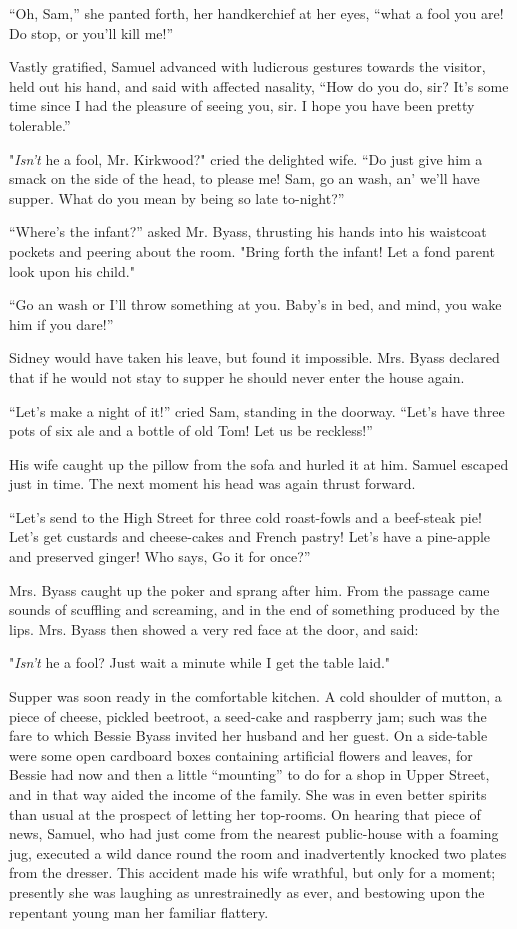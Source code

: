 ``Oh, Sam,'' she panted forth, her handkerchief at her eyes, ``what a
fool you are! Do stop, or you'll kill me!''

Vastly gratified, Samuel advanced with ludicrous gestures towards the
visitor, held out his hand, and said with affected nasality, ``How do
you do, sir? It's some time since I had the pleasure of seeing you, sir.
I hope you have been pretty tolerable.''

"\emph{Isn't} he a fool, Mr. Kirkwood?" cried the delighted wife. ``Do
just give him a smack on the side of the head, to please me! Sam, go an
wash, an' we'll have supper. What do you mean by being so late
to-night?''

``Where's the infant?'' asked Mr. Byass, thrusting his hands into his
waistcoat pockets and peering about the room. "Bring forth {}the infant!
Let a fond parent look upon his child."

``Go an wash or I'll throw something at you. Baby's in bed, and mind,
you wake him if you dare!''

Sidney would have taken his leave, but found it impossible. Mrs. Byass
declared that if he would not stay to supper he should never enter the
house again.

``Let's make a night of it!'' cried Sam, standing in the doorway.
``Let's have three pots of six ale and a bottle of old Tom! Let us be
reckless!''

His wife caught up the pillow from the sofa and hurled it at him. Samuel
escaped just in time. The next moment his head was again thrust forward.

``Let's send to the High Street for three cold roast-fowls and a
beef-steak pie! Let's get custards and cheese-cakes and French pastry!
Let's have a pine-apple and preserved ginger! Who says, Go it for
once?''

Mrs. Byass caught up the poker and sprang {}after him. From the passage
came sounds of scuffling and screaming, and in the end of something
produced by the lips. Mrs. Byass then showed a very red face at the
door, and said:

"\emph{Isn't} he a fool? Just wait a minute while I get the table laid."

Supper was soon ready in the comfortable kitchen. A cold shoulder of
mutton, a piece of cheese, pickled beetroot, a seed-cake and raspberry
jam; such was the fare to which Bessie Byass invited her husband and her
guest. On a side-table were some open cardboard boxes containing
artificial flowers and leaves, for Bessie had now and then a little
``mounting'' to do for a shop in Upper Street, and in that way aided the
income of the family. She was in even better spirits than usual at the
prospect of letting her top-rooms. On hearing that piece of news,
Samuel, who had just come from the nearest public-house with a foaming
jug, executed a wild dance round the room and inadvertently knocked two
plates from the dresser. This accident made {}his wife wrathful, but
only for a moment; presently she was laughing as unrestrainedly as ever,
and bestowing upon the repentant young man her familiar flattery.

